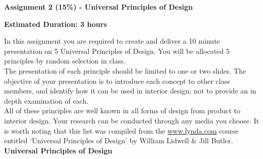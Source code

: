 
	
\begin{flushleft}
\Large\textbf{Assignment 2 (15\%) - Universal Principles of Design}\\
\end{flushleft}

\begin{flushleft}
	\large\textbf{Estimated Duration: 3 hours}\\
\end{flushleft}


In this assignment you are required to create and deliver a 10 minute presentation on 5 Universal Principles of Design.  You will be allocated 5 principles by random selection in class.\\

The presentation of each principle should be limited to one or two slides.  The objective of your presentation is to introduce each concept to other class members, and identify how it can be used in interior design; not to provide an in depth examination of each.\\

All of these principles are well known in all forms of design from product to interior design.  Your research can be conducted through any media you choose.  It is worth noting that this list was compiled from the \href{www.lynda.com}{www.lynda.com} course entitled `Universal Principles of Design' by  William Lidwell \& Jill Butler.\\

\textbf{Universal Principles of Design}
\\


